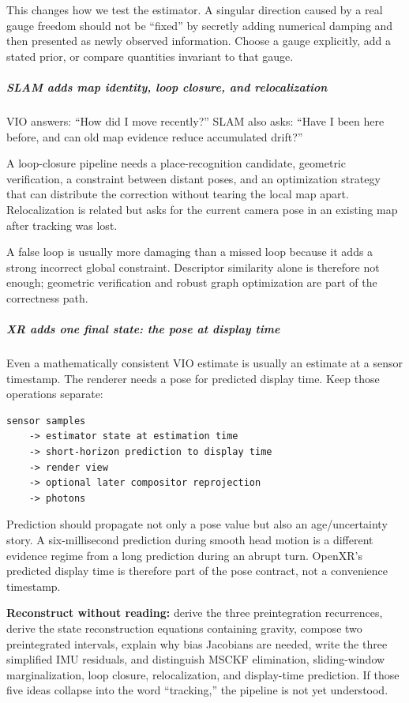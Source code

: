 This changes how we test the estimator. A singular direction caused by a real gauge freedom should not be ``fixed'' by secretly adding numerical damping and then presented as newly observed information. Choose a gauge explicitly, add a stated prior, or compare quantities invariant to that gauge.

\subparagraph{SLAM adds map identity, loop closure, and relocalization}\label{slam-adds-map-identity-loop-closure-and-relocalization}

VIO answers: ``How did I move recently?'' SLAM also asks: ``Have I been here before, and can old map evidence reduce accumulated drift?''

A loop-closure pipeline needs a place-recognition candidate, geometric verification, a constraint between distant poses, and an optimization strategy that can distribute the correction without tearing the local map apart. Relocalization is related but asks for the current camera pose in an existing map after tracking was lost.

A false loop is usually more damaging than a missed loop because it adds a strong incorrect global constraint. Descriptor similarity alone is therefore not enough; geometric verification and robust graph optimization are part of the correctness path.

\subparagraph{XR adds one final state: the pose at display time}\label{xr-adds-one-final-state-the-pose-at-display-time}

Even a mathematically consistent VIO estimate is usually an estimate at a sensor timestamp. The renderer needs a pose for predicted display time. Keep those operations separate:

\begin{verbatim}
sensor samples
    -> estimator state at estimation time
    -> short-horizon prediction to display time
    -> render view
    -> optional later compositor reprojection
    -> photons
\end{verbatim}

Prediction should propagate not only a pose value but also an age/uncertainty story. A six-millisecond prediction during smooth head motion is a different evidence regime from a long prediction during an abrupt turn. OpenXR's predicted display time is therefore part of the pose contract, not a convenience timestamp.

\textbf{Reconstruct without reading:} derive the three preintegration recurrences, derive the state reconstruction equations containing gravity, compose two preintegrated intervals, explain why bias Jacobians are needed, write the three simplified IMU residuals, and distinguish MSCKF elimination, sliding-window marginalization, loop closure, relocalization, and display-time prediction. If those five ideas collapse into the word ``tracking,'' the pipeline is not yet understood.

